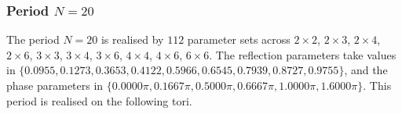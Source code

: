 \par
\subsubsection{Period $N = 20$}
The period $N=20$ is realised by $112$ parameter sets across $2\times2$, $2\times3$, $2\times4$, $2\times6$, $3\times3$, $3\times4$, $3\times6$, $4\times4$, $4\times6$, $6\times6$. The reflection parameters take values in $\{0.0955, 0.1273, 0.3653, 0.4122, 0.5966, 0.6545, 0.7939, 0.8727, 0.9755\}$, and the phase parameters in $\{0.0000\pi, 0.1667\pi, 0.5000\pi, 0.6667\pi, 1.0000\pi, 1.6000\pi\}$. This period is realised on the following tori.
